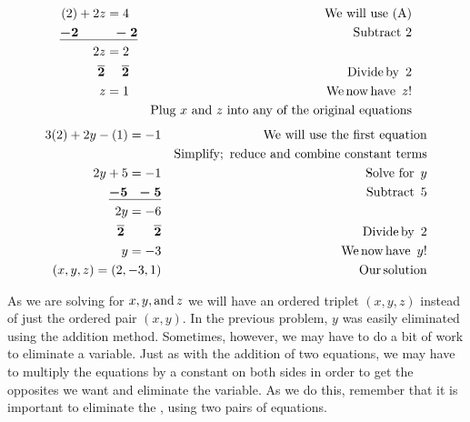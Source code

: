 \begin{example}
\begin{eqnarray*}
    (2) + 2 z = 4~~ &  & \text{We~will~use~(A)}\\
    \tmmathbf{\underline{- 2 ~~~~~~~~- 2}} &  & \text{Subtract~} 2\\
    2 z = 2~~ &  &\\
    \tmmathbf{\overline{2} ~~~~ \overline{2}}~~ &  &  \tmop{Divide} \tmop{by~} 2\\
    z = 1~~ &  & \tmop{We} \tmop{now} \tmop{have~} z!\\
    &  &  \text{Plug~} x \text{~and~} z \text{~into~any~of~the~} \text{original~equations}%
 \end{eqnarray*}
 \begin{eqnarray*}
    3 (2) + 2 y - (1) = - 1 &  & \operatorname{We~will~use~the~first~equation}\\
    &  & \operatorname{Simplify;~reduce~and~combine~constant~terms}\\
		2 y + 5 = - 1 & & \operatorname{Solve~for~} y\\
		\boldsymbol{\underline{- 5 ~~- 5}} &  &\operatorname{Subtract~} 5\\
    2 y = - 6 &  &\\
    \boldsymbol{\overline{2} ~~~~~~~ \overline{2}} &  &  \operatorname{Divide} \operatorname{by~} 2\\
    y = - 3 &  & \operatorname{We} \operatorname{now} \operatorname{have~} y!\\
    (x,y,z)=(2, - 3, 1) &  & \operatorname{Our} \operatorname{solution}
  \end{eqnarray*}
\end{example}
As we are solving for $x, y, \operatorname{and} z$ we will have an ordered triplet
$(x, y, z)$ instead of just the ordered pair $(x, y)$. In the previous problem,
$y$ was easily eliminated using the addition method. Sometimes, however, we may
have to do a bit of work to eliminate a variable. Just as with the addition
of two equations, we may have to multiply the equations by a constant on both sides
in order to get the opposites we want and eliminate the variable. As we do this, remember that 
it is important to eliminate the {}, using
two {} pairs of equations.

